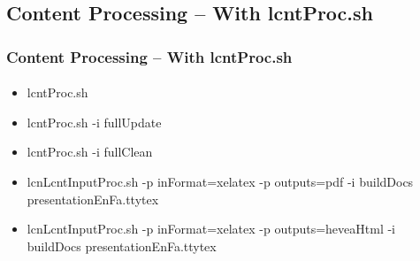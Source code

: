 \subsection{Content Processing -- With lcntProc.sh}


\begin{comment}
*****  [[elisp:(org-cycle)][| ]]  [[elisp:(blee:ppmm:org-mode-toggle)][Nat]] [[elisp:(beginning-of-buffer)][Top]] [[elisp:(delete-other-windows)][(1)]] || /Frame/ *Label=ContentProcessing--WithlcntProc.sh*  Content Processing -- With lcntProc.sh ::  [[elisp:(org-cycle)][| ]]
\end{comment}

\begin{frame}[fragile,label=ContentProcessing--WithlcntProc.sh]
    \frametitle{Content Processing -- With lcntProc.sh}
    \framesubtitle{}

\begin{itemize}
\item lcntProc.sh
\item lcntProc.sh -i fullUpdate
\item lcntProc.sh -i fullClean
\item lcnLcntInputProc.sh -p inFormat=xelatex -p outputs=pdf -i buildDocs  presentationEnFa.ttytex
\item lcnLcntInputProc.sh -p inFormat=xelatex -p outputs=heveaHtml -i buildDocs  presentationEnFa.ttytex
\end{itemize}

\end{frame}


\begin{comment}
**  [[elisp:(org-cycle)][| ]] [[elisp:(org-show-subtree)][|=]] [[elisp:(show-children 10)][|V]] [[elisp:(bx:orgm:indirectBufOther)][|>]] [[elisp:(bx:orgm:indirectBufMain)][|I]] [[elisp:(blee:ppmm:org-mode-toggle)][|N]] [[elisp:(org-top-overview)][|O]] [[elisp:(progn (org-shifttab) (org-content))][|C]] [[elisp:(delete-other-windows)][|1]]  /Subsection/   Content Processing -- With Panel.org ::  [[elisp:(org-cycle)][| ]]
\end{comment}

